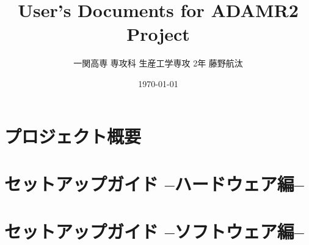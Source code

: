 \documentclass[uplatex, a4paper]{jsreport}
\title{\Huge User's Documents for ADAMR2 Project}
\author{一関高専 専攻科 生産工学専攻 2年 藤野航汰}
\date{\today}
\begin{document}
\maketitle  %

\tableofcontents  %
\newpage

\chapter{プロジェクト概要}




\chapter{セットアップガイド --ハードウェア編--}


\chapter{セットアップガイド --ソフトウェア編--}


\end{document}
